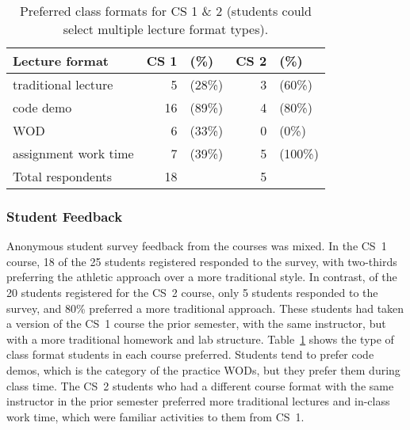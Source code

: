 
\begin{table}

\begin{center}
\begin{tabular}{lrlrl}
Lecture format & CS 1 & (\%) & CS 2 & (\%) \\
\hline
traditional lecture & 5 & (28\%)  & 3 & (60\%)\\
code demo & 16 & (89\%)  & 4 & (80\%)  \\
WOD &  6 & (33\%) & 0 & (0\%) \\
assignment work time & 7  & (39\%) & 5 & (100\%) \\
\hline
Total respondents &  18 &  & 5 &  \\

\end{tabular}
\end{center}
\caption{Preferred class formats for CS 1 \& 2 (students could select multiple lecture format types).}
\label{tab:format}
\end{table}

\subsubsection{Student Feedback}


Anonymous student survey feedback from the courses was mixed. In the CS~1 course, 18 of the 25 students registered responded to the survey, with two-thirds preferring the athletic approach over a more traditional style. In contrast, of the 20 students registered for the CS~2 course, only 5 students responded to the survey, and 80\% preferred a more traditional approach. 
These students had taken a version of the CS~1 course the prior semester, with the same instructor, but with a more traditional homework and lab structure. Table~\ref{tab:format} shows the type of class format students in each course preferred. Students tend to prefer code demos, which is the category of the practice WODs, but they prefer them during class time. The CS~2 students who had a different course format with the same instructor in the prior semester preferred more traditional lectures and in-class work time, which were familiar activities to them from CS~1.

